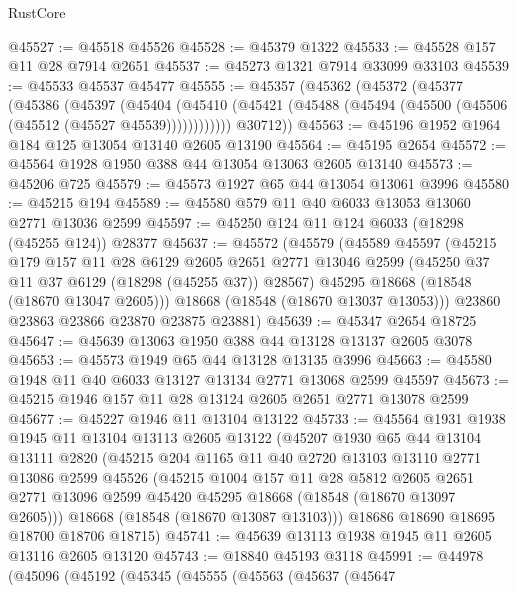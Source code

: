 \begin{lexlean}{RustCore}
\begin{coremodule}
@45527 := @45518 @45526
@45528 := @45379 @1322
@45533 := @45528 @157 @11 @28 @7914 @2651
@45537 := @45273 @1321 @7914 @33099 @33103
@45539 := @45533 @45537 @45477
@45555 := @45357
    (@45362
      (@45372
        (@45377
          (@45386
            (@45397
              (@45404
                (@45410 (@45421 (@45488 (@45494 (@45500 (@45506 (@45512 (@45527 @45539))))))))))))
        @30712))
@45563 := @45196 @1952 @1964 @184 @125 @13054 @13140 @2605 @13190
@45564 := @45195 @2654
@45572 := @45564 @1928 @1950 @388 @44 @13054 @13063 @2605 @13140
@45573 := @45206 @725
@45579 := @45573 @1927 @65 @44 @13054 @13061 @3996
@45580 := @45215 @194
@45589 := @45580 @579 @11 @40 @6033 @13053 @13060 @2771 @13036 @2599
@45597 := @45250 @124 @11 @124 @6033 (@18298 (@45255 @124)) @28377
@45637 := @45572
    (@45579
      (@45589
        @45597
        (@45215
          @179
          @157
          @11
          @28
          @6129
          @2605
          @2651
          @2771
          @13046
          @2599
          (@45250 @37 @11 @37 @6129 (@18298 (@45255 @37)) @28567)
          @45295
          @18668
          (@18548 (@18670 @13047 @2605)))
        @18668
        (@18548 (@18670 @13037 @13053)))
      @23860
      @23863
      @23866
      @23870
      @23875
      @23881)
@45639 := @45347 @2654 @18725
@45647 := @45639 @13063 @1950 @388 @44 @13128 @13137 @2605 @3078
@45653 := @45573 @1949 @65 @44 @13128 @13135 @3996
@45663 := @45580 @1948 @11 @40 @6033 @13127 @13134 @2771 @13068 @2599 @45597
@45673 := @45215 @1946 @157 @11 @28 @13124 @2605 @2651 @2771 @13078 @2599
@45677 := @45227 @1946 @11 @13104 @13122
@45733 := @45564
    @1931
    @1938
    @1945
    @11
    @13104
    @13113
    @2605
    @13122
    (@45207
      @1930
      @65
      @44
      @13104
      @13111
      @2820
      (@45215
        @204
        @1165
        @11
        @40
        @2720
        @13103
        @13110
        @2771
        @13086
        @2599
        @45526
        (@45215
          @1004
          @157
          @11
          @28
          @5812
          @2605
          @2651
          @2771
          @13096
          @2599
          @45420
          @45295
          @18668
          (@18548 (@18670 @13097 @2605)))
        @18668
        (@18548 (@18670 @13087 @13103)))
      @18686
      @18690
      @18695
      @18700
      @18706
      @18715)
@45741 := @45639 @13113 @1938 @1945 @11 @2605 @13116 @2605 @13120
@45743 := @18840 @45193 @3118
@45991 := @44978
    (@45096
      (@45192
        (@45345
          (@45555
            (@45563
              (@45637
                (@45647

\end{coremodule}
\end{lexlean}

